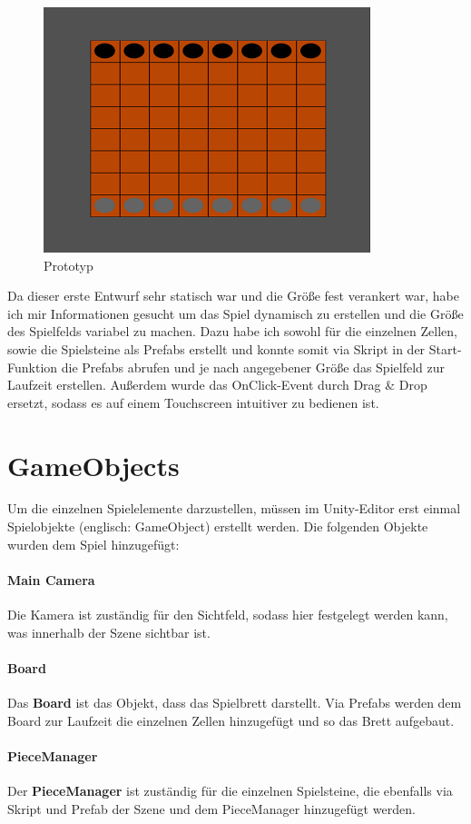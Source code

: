 \begin{figure}[h]
	\centering
	\includegraphics{img/Prototyp}
	\caption{Prototyp}
	\label{fig:Prototyp}
\end{figure}

Da dieser erste Entwurf sehr statisch war und die Größe fest verankert war, habe ich mir Informationen gesucht um das Spiel dynamisch zu erstellen und die Größe des Spielfelds variabel zu machen. Dazu habe ich sowohl für die einzelnen Zellen, sowie die Spielsteine als Prefabs erstellt und konnte somit via Skript in der Start-Funktion die Prefabs abrufen und je nach angegebener Größe das Spielfeld zur Laufzeit erstellen.
Außerdem wurde das OnClick-Event durch Drag \& Drop ersetzt, sodass es auf einem Touchscreen intuitiver zu bedienen ist.
\section{GameObjects}
\label{ch:Implementierung:sec:GameObjects}
Um die einzelnen Spielelemente darzustellen, müssen im Unity-Editor erst einmal Spielobjekte (englisch: GameObject) erstellt werden. Die folgenden Objekte wurden dem Spiel hinzugefügt:
\paragraph{Main Camera}
Die Kamera ist zuständig für den Sichtfeld, sodass hier festgelegt werden kann, was innerhalb der Szene sichtbar ist.
\paragraph{Board}
Das \textbf{Board} ist das Objekt, dass das Spielbrett darstellt. Via Prefabs werden dem Board zur Laufzeit die einzelnen Zellen hinzugefügt und so das Brett aufgebaut.
\paragraph{PieceManager}
Der \textbf{PieceManager} ist zuständig für die einzelnen Spielsteine, die ebenfalls via Skript und Prefab der Szene und dem PieceManager hinzugefügt werden.
